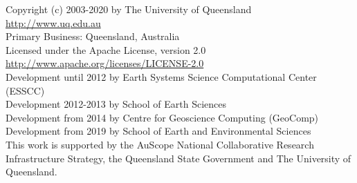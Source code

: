 
%
%
%

\begin{center}
Copyright (c) 2003-2020 by The University of Queensland\\
\url{http://www.uq.edu.au}\\
Primary Business: Queensland, Australia\\
Licensed under the Apache License, version 2.0\\
\url{http://www.apache.org/licenses/LICENSE-2.0}\\
Development until 2012 by Earth Systems Science Computational Center (ESSCC)\\
Development 2012-2013 by School of Earth Sciences\\
Development from 2014 by Centre for Geoscience Computing (GeoComp)\\
Development from 2019 by School of Earth and Environmental Sciences\\

This work is supported by the AuScope National Collaborative Research
Infrastructure Strategy, the Queensland State Government and The University
of Queensland.
\end{center}

